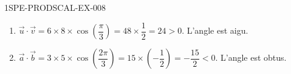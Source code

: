 \begin{corrige}{1SPE-PRODSCAL-EX-008}
\begin{enumerate}
\item $\vec{u} \cdot \vec{v} = 6 \times 8 \times \cos\!\left(\dfrac{\pi}{3}\right) = 48 \times \dfrac{1}{2} = 24 > 0$. L'angle est aigu.
\item $\vec{a} \cdot \vec{b} = 3 \times 5 \times \cos\!\left(\dfrac{2\pi}{3}\right) = 15 \times \left(-\dfrac{1}{2}\right) = -\dfrac{15}{2} < 0$. L'angle est obtus.
\end{enumerate}
\end{corrige}
